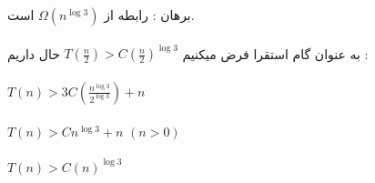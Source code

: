 برهان : رابطه از $\Omega(n^{\log3})$ است. \\\\
به عنوان گام استقرا فرض میکنیم $T(\frac{n}{2}) > C (\frac{n}{2})^{\log3}$ حال داریم : \\\\
$T(n) > 3C (\frac{n^{\log3}}{2^{\log3}}) + n$\\\\
$T(n) > Cn^{\log3} + n$  \quad $(n>0)$\\\\
$T(n) > C(n)^{\log3}$\\\\\\

\subproblem{}
\subproblem{}
\subproblem{}
\subproblem{}
